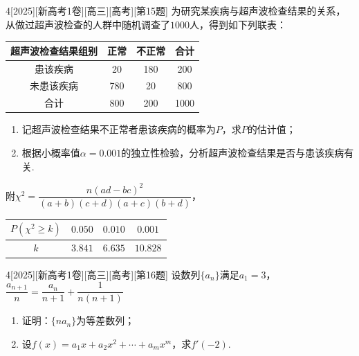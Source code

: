 \begin{example}{4}[2025][新高考1卷][高三][高考][第15题]
为研究某疾病与超声波检查结果的关系，从做过超声波检查的人群中随机调查了$1000$人，得到如下列联表：
\begin{center}
\begin{tabular}{|c|c|c|c|}
\hline
超声波检查结果组别 & 正常 & 不正常 & 合计 \\
\hline
患该疾病 & 20 & 180 & 200 \\
\hline
未患该疾病 & 780 & 20 & 800 \\
\hline
合计 & 800 & 200 & 1000 \\
\hline
\end{tabular}
\end{center}
\begin{enumerate}
    \item 记超声波检查结果不正常者患该疾病的概率为$P$，求$P$的估计值；
    \item 根据小概率值$\alpha=0.001$的独立性检验，分析超声波检查结果是否与患该疾病有关.
\end{enumerate}
附$\chi^2=\dfrac{n(ad-bc)^2}{(a+b)(c+d)(a+c)(b+d)}$，
\begin{center}
\begin{tabular}{|c|c|c|c|}
\hline
$P(\chi^2\ge k)$ & $0.050$ & $0.010$ & $0.001$ \\
\hline
$k$ & $3.841$ & $6.635$ & $10.828$ \\
\hline
\end{tabular}
\end{center}
\end{example}

\begin{example}{4}[2025][新高考1卷][高三][高考][第16题]
设数列$\{a_n\}$满足$a_1=3$，$\dfrac{a_{n+1}}{n}=\dfrac{a_n}{n+1}+\dfrac{1}{n(n+1)}$
\begin{enumerate}
    \item 证明：$\{na_n\}$为等差数列；
    \item 设$f(x)=a_1x+a_2x^2+\cdots+a_mx^m$，求$f'(-2)$.
\end{enumerate}
\end{example}

